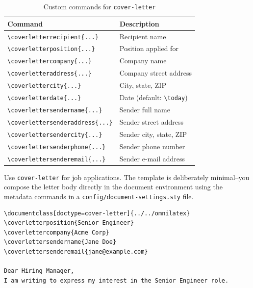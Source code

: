 \begin{table}[htbp]
    \centering
    \caption{Custom commands for \texttt{cover-letter}}
    \label{tab:coverletter-commands}
    \begin{tabular}{@{} l p{8cm} @{}}
        \toprule
        \textbf{Command} & \textbf{Description} \\
        \midrule
        \texttt{\textbackslash coverletterrecipient\{...\}}   & Recipient name \\
        \texttt{\textbackslash coverletterposition\{...\}}    & Position applied for \\
        \texttt{\textbackslash coverlettercompany\{...\}}     & Company name \\
        \texttt{\textbackslash coverletteraddress\{...\}}     & Company street address \\
        \texttt{\textbackslash coverlettercity\{...\}}        & City, state, ZIP \\
        \texttt{\textbackslash coverletterdate\{...\}}        & Date (default: \texttt{\textbackslash today}) \\
        \texttt{\textbackslash coverlettersendername\{...\}}  & Sender full name \\
        \texttt{\textbackslash coverlettersenderaddress\{...\}} & Sender street address \\
        \texttt{\textbackslash coverlettersendercity\{...\}}  & Sender city, state, ZIP \\
        \texttt{\textbackslash coverlettersenderphone\{...\}} & Sender phone number \\
        \texttt{\textbackslash coverlettersenderemail\{...\}} & Sender e-mail address \\
        \bottomrule
    \end{tabular}
\end{table}

Use \texttt{cover-letter} for job applications.  The template is deliberately
minimal--you compose the letter body directly in the document environment
using the metadata commands in a \texttt{config/document-settings.sty} file.

\begin{verbatim}
\documentclass[doctype=cover-letter]{../../omnilatex}
\coverletterposition{Senior Engineer}
\coverlettercompany{Acme Corp}
\coverlettersendername{Jane Doe}
\coverlettersenderemail{jane@example.com}

Dear Hiring Manager,
I am writing to express my interest in the Senior Engineer role.

\end{verbatim}
